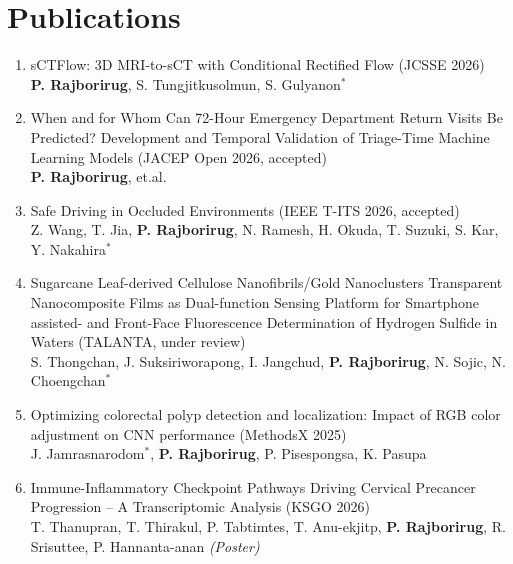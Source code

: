 \documentclass[a4paper,10pt]{article}
\renewcommand{\small}{\fontsize{9}{10.6}\selectfont}
\begin{document}
\section{\textbf{Publications}}
\begin{enumerate}[leftmargin=*,itemsep=0pt,topsep=0pt,parsep=0pt]\small
\item {sCTFlow: 3D MRI-to-sCT with Conditional Rectified Flow (JCSSE 2026) \href{https://ieeexplore.ieee.org/abstract/document/11596689/}{\footnotesize\faFile[regular]}\\
\textbf{P. Rajborirug}, S. Tungjitkusolmun, S. Gulyanon$^*$
}
\item {When and for Whom Can 72-Hour Emergency Department Return Visits Be Predicted? Development and Temporal Validation of Triage-Time Machine Learning Models (JACEP Open 2026, accepted)\\
\textbf{P. Rajborirug}, et.al. 
}
\item {Safe Driving in Occluded Environments (IEEE T-ITS 2026, accepted)\\
Z. Wang, T. Jia, \textbf{P. Rajborirug}, N. Ramesh, H. Okuda, T. Suzuki, S. Kar, Y. Nakahira$^*$
}
\item {Sugarcane Leaf-derived Cellulose Nanofibrils/Gold Nanoclusters Transparent Nanocomposite Films as Dual-function Sensing Platform for Smartphone assisted- and Front-Face Fluorescence Determination of Hydrogen Sulfide in Waters (TALANTA, under review)\\
S. Thongchan, J. Suksiriworapong, I. Jangchud, \textbf{P. Rajborirug}, N. Sojic, N. Choengchan$^*$
}
\item {Optimizing colorectal polyp detection and localization: Impact of RGB color adjustment on CNN performance (MethodsX 2025) \href{https://www.sciencedirect.com/science/article/pii/S2215016125000354}{\footnotesize\faFile[regular]}\\
J. Jamrasnarodom$^*$, \textbf{P. Rajborirug}, P. Pisespongsa, K. Pasupa }
\item {Immune-Inflammatory Checkpoint Pathways Driving Cervical Precancer Progression -- A Transcriptomic Analysis (KSGO 2026) \href{https://canva.link/u054tccwa9xr8ms}{\footnotesize\faFile[regular]}\\
T. Thanupran, T. Thirakul, P. Tabtimtes, T. Anu-ekjitp, \textbf{P. Rajborirug}, R. Srisuttee, P. Hannanta-anan \textit{(Poster)}}
\end{enumerate}
\vspace{-4mm}
\end{document}
